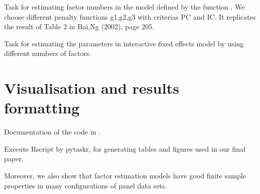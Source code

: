 \documentclass[a4paper,11pt,english]{sphinxmanual}
\begin{document}

\begin{fulllineitems}
\label{\detokenize{analysis:src.analysis.task_simulation_factor.task_factor_estimate_random_iid_residual}}
\sphinxAtStartPar
Task for estimating factor numbers in the model defined by the function
.
We choose different penalty functions g1,g2,g3 with criterias PC and IC.
It replicates the result of Table 2 in Bai,Ng (2002), page 205.

\end{fulllineitems}


\begin{fulllineitems}
\label{\detokenize{analysis:src.analysis.task_simulation_factor.task_simulation_and_statistics_range_r}}
\sphinxAtStartPar
Task for estimating the parameters in interactive fixed effects model by using
different numbers of factors.

\end{fulllineitems}



\chapter{Visualisation and results formatting}
\label{\detokenize{final:visualisation-and-results-formatting}}\label{\detokenize{final:final}}\label{\detokenize{final::doc}}
\sphinxAtStartPar
Documentation of the code in .

\sphinxAtStartPar
Execute R\sphinxhyphen{}script by pytask\sphinxhyphen{}r, for generating tables and figures used in our final paper.

\sphinxAtStartPar
Moreover, we also show that factor estimation models have good finite sample properties
in many configurations of panel data sets.
\end{document}
